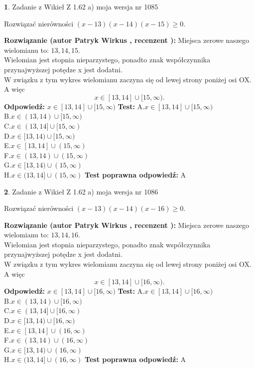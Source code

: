 \documentclass[12pt, a4paper]{article}
\theoremstyle{definition} %
\newtheorem{zad}{}
\newcommand{\zadStart}[1]{\begin{zad}#1\newline}
\newcommand{\zadStop}{\end{zad}}
\newcommand{\rozwStart}[2]{\noindent \textbf{Rozwiązanie (autor #1 , recenzent #2): }\newline}
\newcommand{\rozwStop}{\newline}
\newcommand{\odpStart}{\noindent \textbf{Odpowiedź:}\newline}
\newcommand{\odpStop}{\newline}
\newcommand{\testStart}{\noindent \textbf{Test:}\newline}
\newcommand{\testStop}{\newline}
\newcommand{\kluczStart}{\noindent \textbf{Test poprawna odpowiedź:}\newline}
\newcommand{\kluczStop}{\newline}
\begin{document}
\zadStart{Zadanie z Wikieł Z 1.62 a) moja wersja nr 1085}

Rozwiązać nierówności $(x-13)(x-14)(x-15)\ge0$.
\zadStop
\rozwStart{Patryk Wirkus}{}
Miejsca zerowe naszego wielomianu to: $13, 14, 15$.\\
Wielomian jest stopnia nieparzystego, ponadto znak współczynnika przy\linebreak najwyższej potędze x jest dodatni.\\ W związku z tym wykres wielomianu zaczyna się od lewej strony poniżej osi OX. A więc $$x \in [13,14] \cup [15,\infty).$$
\rozwStop
\odpStart
$x \in [13,14] \cup [15,\infty)$
\odpStop
\testStart
A.$x \in [13,14] \cup [15,\infty)$\\
B.$x \in (13,14) \cup [15,\infty)$\\
C.$x \in (13,14] \cup [15,\infty)$\\
D.$x \in [13,14) \cup [15,\infty)$\\
E.$x \in [13,14] \cup (15,\infty)$\\
F.$x \in (13,14) \cup (15,\infty)$\\
G.$x \in [13,14) \cup (15,\infty)$\\
H.$x \in (13,14] \cup (15,\infty)$
\testStop
\kluczStart
A
\kluczStop



\zadStart{Zadanie z Wikieł Z 1.62 a) moja wersja nr 1086}

Rozwiązać nierówności $(x-13)(x-14)(x-16)\ge0$.
\zadStop
\rozwStart{Patryk Wirkus}{}
Miejsca zerowe naszego wielomianu to: $13, 14, 16$.\\
Wielomian jest stopnia nieparzystego, ponadto znak współczynnika przy\linebreak najwyższej potędze x jest dodatni.\\ W związku z tym wykres wielomianu zaczyna się od lewej strony poniżej osi OX. A więc $$x \in [13,14] \cup [16,\infty).$$
\rozwStop
\odpStart
$x \in [13,14] \cup [16,\infty)$
\odpStop
\testStart
A.$x \in [13,14] \cup [16,\infty)$\\
B.$x \in (13,14) \cup [16,\infty)$\\
C.$x \in (13,14] \cup [16,\infty)$\\
D.$x \in [13,14) \cup [16,\infty)$\\
E.$x \in [13,14] \cup (16,\infty)$\\
F.$x \in (13,14) \cup (16,\infty)$\\
G.$x \in [13,14) \cup (16,\infty)$\\
H.$x \in (13,14] \cup (16,\infty)$
\testStop
\kluczStart
A
\kluczStop
\end{document}
